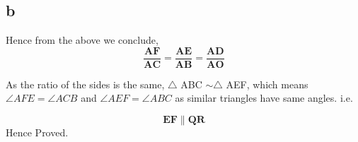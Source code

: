 \documentclass{beamer}
\renewcommand{\vec}[1]{\mathbf{#1}}
\begin{document}
\subsection{b}
\begin{frame}
Hence from the above we conclude,
\begin{equation}
\vec{\frac{AF}{AC}} = \vec{\frac{AE}{AB}} = \vec{\frac{AD}{AO}}
\end{equation}

As the ratio of the sides is the same, $\triangle$ ABC $\sim \triangle$ AEF, which means $\angle{AFE} = \angle{ACB}$ and $\angle{AEF} = \angle{ABC}$ as similar triangles have same angles.
i.e. 

\begin{equation}
\vec{EF} \parallel \vec{QR}
\end{equation}
Hence Proved.
\end{frame}
\end{document}
